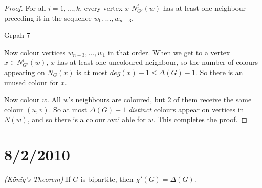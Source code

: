 \documentclass{article}
\begin{document}
\begin{proof}
For all $i=1, \ldots, k$, every vertex $x$ $ N_{G'}^i(w)$ has at least one neighbour preceding it in the sequence $w_0,\ldots, w_{n-3}$.

Grpah 7

 Now colour vertices $w_{n-3}, \ldots, w_1$ in that order.  When we get to a vertex $x \in N_{G'}^i(w)$, $x$ has at least one uncoloured neighbour, so the number of colours appearing on $N_G(x)$ is at most $deg(x)-1 \leq \Delta(G)-1$.  So there is an unused colour for $x$.

Now colour $w$.  All $w$'s neighbours are coloured, but 2 of them receive the same colour $(u,v)$.  So at most $\Delta(G)-1$ \emph{distinct} colours appear on vertices in $N(w)$, and so there is a colour available for $w$.   This completes the proof. 
\end{proof}

\section*{8/2/2010}


\begin{thm}
\emph{(K\"onig's Theorem)} If $G$ is bipartite, then $\chi'(G)=\Delta(G)$.
\end{thm}
\end{document}
